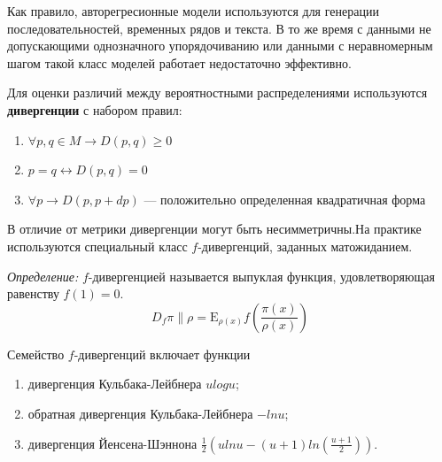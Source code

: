 Как правило, авторегресионные модели используются для генерации последовательностей, временных рядов и текста.
В то же время с данными не допускающими однозначного упорядочиванию или данными с неравномерным шагом такой класс
моделей работает недостаточно эффективно.

Для оценки различий между вероятностными распределениями используются \textbf{дивергенции} с набором правил:
\begin{enumerate}
    \item $\forall p,q \in M \rightarrow D(p,q) \ge 0$  
    \item $p=q \leftrightarrow D(p,q) = 0$
    \item $\forall p \rightarrow D(p,p+dp)$ --- положительно определенная квадратичная форма  
\end{enumerate}

В отличие от метрики дивергенции могут быть несимметричны.На практике используются специальный класс $f$-дивергенций, заданных
 матожиданием.

\textit{Определение:} $f$-дивергенцией называется выпуклая функция, удовлетворяющая равенству $f(1)=0$.
$$
    D_f{\pi \parallel \rho} = \mathrm E_{\rho(x)} f\left(\frac{\pi(x)}{\rho(x)}\right)
$$

Семейство $f$-дивергенций включает функции 
\begin{enumerate}
    \item дивергенция Кульбака-Лейбнера $u logu $;
    \item обратная дивергенция Кульбака-Лейбнера $-ln u$;
    \item дивергенция Йенсена-Шэннона  $\frac{1}{2}\left(u ln u - (u+1) ln(\frac{u+1}{2})\right)$.
\end{enumerate}

